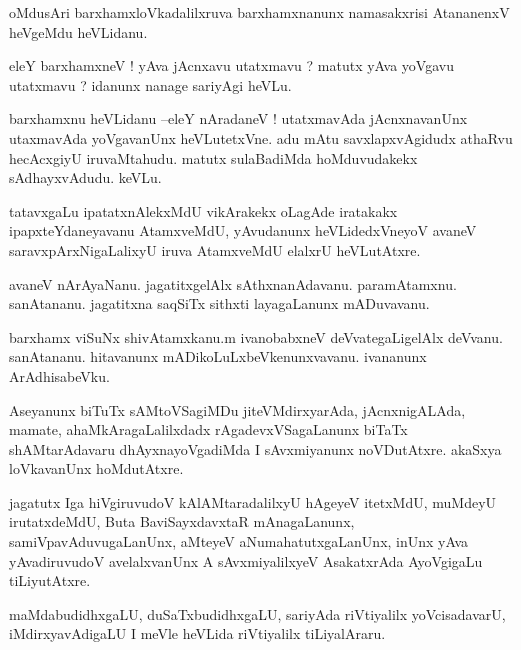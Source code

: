 \documentclass{article}
\begin{document}
\begin{mn}%
oMdusAri barxhamxloVkadalilxruva barxhamxnanunx namasakxrisi AtananenxV heVgeMdu heVLidanu.
\end{mn}

\begin{mn}%
eleY barxhamxneV ! yAva jAcnxavu utatxmavu ? matutx yAva yoVgavu utatxmavu ? idanunx nanage 
sariyAgi heVLu.
\end{mn}

\begin{mn}%
barxhamxnu heVLidanu --eleY nAradaneV ! utatxmavAda jAcnxnavanUnx utaxmavAda yoVgavanUnx 
heVLutetxVne. adu mAtu savxlapxvAgidudx athaRvu hecAcxgiyU iruvaMtahudu. matutx sulaBadiMda 
hoMduvudakekx sAdhayxvAdudu. keVLu.
\end{mn}

\begin{mn}%
tatavxgaLu ipatatxnAlekxMdU vikArakekx oLagAde iratakakx ipapxteYdaneyavanu AtamxveMdU, yAvudanunx 
heVLidedxVneyoV avaneV saravxpArxNigaLalixyU iruva AtamxveMdU elalxrU heVLutAtxre.
\end{mn}

\begin{mn}%
avaneV nArAyaNanu. jagatitxgelAlx sAthxnanAdavanu. paramAtamxnu. sanAtananu. jagatitxna saqSiTx 
sithxti layagaLanunx mADuvavanu.
\end{mn}

\begin{mn}%
barxhamx viSuNx shivAtamxkanu.m ivanobabxneV deVvategaLigelAlx deVvanu. sanAtananu. hitavanunx 
mADikoLuLxbeVkenunxvavanu. ivananunx ArAdhisabeVku.
\end{mn}

\begin{mn}%
Aseyanunx biTuTx sAMtoVSagiMDu jiteVMdirxyarAda, jAcnxnigALAda, mamate, ahaMkAragaLalilxdadx 
rAgadevxVSagaLanunx biTaTx shAMtarAdavaru dhAyxnayoVgadiMda I sAvxmiyanunx noVDutAtxre. akaSxya 
loVkavanUnx hoMdutAtxre.
\end{mn}

\begin{mn}%
jagatutx Iga hiVgiruvudoV kAlAMtaradalilxyU hAgeyeV itetxMdU, muMdeyU irutatxdeMdU, Buta 
BaviSayxdavxtaR mAnagaLanunx, samiVpavAduvugaLanUnx, aMteyeV aNumahatutxgaLanUnx, inUnx yAva 
yAvadiruvudoV avelalxvanUnx A sAvxmiyalilxyeV AsakatxrAda AyoVgigaLu tiLiyutAtxre.
\end{mn}

\begin{mn}%
maMdabudidhxgaLU, duSaTxbudidhxgaLU, sariyAda riVtiyalilx yoVcisadavarU, iMdirxyavAdigaLU I meVle 
heVLida riVtiyalilx tiLiyalAraru.
\end{mn}
\end{document}
